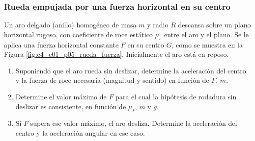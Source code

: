 \subsubsection{Rueda empujada por una fuerza horizontal en su centro}

Un aro delgado (anillo) homogéneo de masa $m$ y radio $R$ descansa sobre un plano horizontal rugoso, con coeficiente de roce estático $\mu_s$ entre el aro y el plano. Se le aplica una fuerza horizontal constante $F$ en su centro $G$, como se muestra en la Figura \ref{fig:c4_e01_p05_rueda_fuerza}. Inicialmente el aro está en reposo.

\begin{enumerate}
    \item Suponiendo que el aro rueda sin deslizar, determine la aceleración del centro y la fuerza de roce necesaria (magnitud y sentido) en función de $F$, $m$.
    \item Determine el valor máximo de $F$ para el cual la hipótesis de rodadura sin deslizar es consistente, en función de $\mu_s$, $m$ y $g$.
    \item Si $F$ supera ese valor máximo, el aro desliza. Determine la aceleración del centro y la aceleración angular en ese caso.
\end{enumerate}

